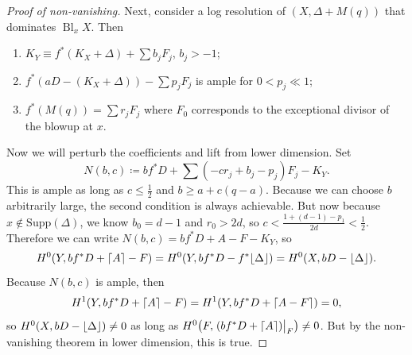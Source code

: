 \documentclass[leqno, openany]{memoir}
\DeclarePairedDelimiter{\floor}{\lfloor}{\rfloor}
\DeclarePairedDelimiter{\ceil}{\lceil}{\rceil}
\theoremstyle{definition}
\theoremstyle{remark}
\theoremstyle{plain}
\theoremstyle{definition}
\theoremstyle{remark}
\newcommand{\mr}[1]{\mathrm{#1}}
\DeclareMathOperator{\Bl}{Bl}
\begin{document}
\begin{proof}[Proof of non-vanishing]
    Next, consider a log resolution of $(X, \Delta + M(q))$ that dominates $\Bl_x X$. Then
    \begin{enumerate}
        \item $K_Y \equiv f^*(K_X + \Delta) + \sum b_j F_j$, $b_j > -1$;
        \item $f^*(aD - (K_X + \Delta)) - \sum p_j F_j$ is ample for $0 < p_j \ll 1$;
        \item $f^*(M(q)) = \sum r_j F_j$ where $F_0$ corresponds to the exceptional divisor of the blowup at $x$.
    \end{enumerate}

    Now we will perturb the coefficients and lift from lower dimension. Set
    \[ N(b,c) \coloneqq b f^* D + \sum (-c r_j + b_j - p_j) F_j - K_Y. \]
    This is ample as long as $c \leq \frac{1}{2}$ and $b \geq a + c(q-a)$. Because we can choose $b$ arbitrarily large, the second condition is always achievable. But now because $x \notin \mr{Supp}(\Delta)$, we know $b_0 = d-1$ and $r_0 > 2d$, so $c < \frac{1+(d-1)-p_1}{2d} < \frac{1}{2}$. Therefore we can write $N(b,c) = bf^* D + A - F - K_Y$, so 
    \[ H^0(Y, bf^*D + \ceil{A} - F) = H^0(Y, bf^*D - f^* \floor{\Delta}) = H^0(X, bD - \floor{\Delta}). \]
    Because $N(b,c)$ is ample, then
    \[ H^1(Y, bf^*D + \ceil{A} - F) = H^1(Y, bf^*D + \ceil{A-F}) = 0,\] 
    so $H^0(X, bD - \floor{\Delta}) \neq 0$ as long as $H^0\qty(F, \eval{(bf^*D + \ceil{A})}_F) \neq 0$. But by the non-vanishing theorem in lower dimension, this is true.
\end{proof}
\end{document}
